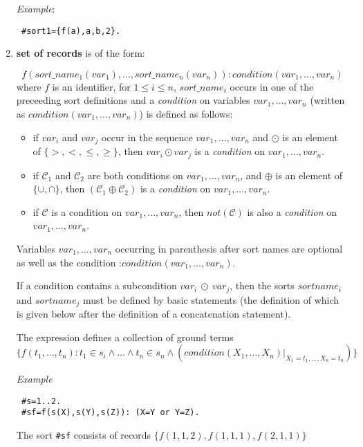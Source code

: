 \documentclass[12pt, letterpaper]{article}
\begin{document}
\begin{enumerate}
\textit{Example}: 
\begin{verbatim}
 #sort1={f(a),a,b,2}.
\end{verbatim}
\item \textbf{set of records} is of the form:

\begin{equation*}
f(sort\_name_1(var_1),..., sort\_name_n(var_n)):
                                     condition(var_1,...,var_n)
\end{equation*}
where $f$ is an identifier, for $ 1\leq i\leq n$, $sort\_name_i$ occurs in one of the preceeding sort definitions and a \textit{condition} on variables $var_1,...,var_n$ (written as $condition(var_1,...,var_n)$) is defined as follows:

\begin{itemize}
\item if $var_i$ and $var_j$ occur in the sequence  $var_1,...,var_n$ and $\odot$ is an element of $\{>,<,\le,\ge\}$, then $var_i \odot var_j$ is a \textit{condition} on   $var_1,...,var_n$.
\item if $\mathcal{C}_1$ and $\mathcal{C}_2$ are both conditions on  $var_1,...,var_n$, and $\oplus$ is an element of  $\{\cup,\cap\}$, then
$(\mathcal{C}_1 \oplus \mathcal{C}_2)$ is a \textit{condition} on  $var_1,...,var_n$.
\item if $\mathcal{C}$ is a  condition on  $var_1,...,var_n$, then $not(\mathcal{C})$ is also a \textit{condition} on  $var_1,...,var_n$.
\end{itemize}
Variables $var_1,...,var_n$ occurring in parenthesis after sort names are optional as well as the condition :$condition(var_1,...,var_n)$.

If a condition contains a subcondition $var_i~\odot~var_j$,  then the sorts  $sortname_i$ and  $sortname_j$ must be defined by basic statements (the definition of which is given below after the definition of a concatenation statement).

The expression defines a collection of ground terms 
\\ $\{f(t_1,\dots,t_n):  t_1 \in s_i \land \dots \land t_n \in s_n \land (condition(X_1,\dots, X_n)|_{X_1 = t_1,\dots,X_n = t_n})\}$

\textit{Example}
\begin{verbatim}
 #s=1..2.
 #sf=f(s(X),s(Y),s(Z)): (X=Y or Y=Z). 
\end{verbatim}

The sort \texttt{\#sf} consists of records $\{f(1,1,2),f(1,1,1),f(2,1,1)\}$




\end{enumerate}
\end{document}
